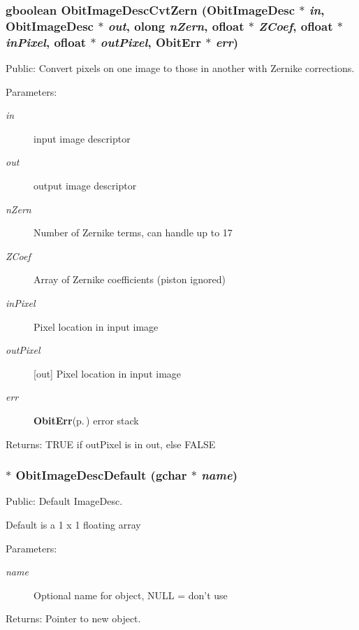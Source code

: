 \subsubsection{\setlength{\rightskip}{0pt plus 5cm}gboolean Obit\-Image\-Desc\-Cvt\-Zern ({\bf Obit\-Image\-Desc} $\ast$ {\em in}, {\bf Obit\-Image\-Desc} $\ast$ {\em out}, {\bf olong} {\em n\-Zern}, {\bf ofloat} $\ast$ {\em ZCoef}, {\bf ofloat} $\ast$ {\em in\-Pixel}, {\bf ofloat} $\ast$ {\em out\-Pixel}, {\bf Obit\-Err} $\ast$ {\em err})}\label{ObitImageDesc_8c_a13}


Public: Convert pixels on one image to those in another with Zernike corrections. 

\begin{Desc}
\item[Parameters:]
\begin{description}
\item[{\em in}]input image descriptor \item[{\em out}]output image descriptor \item[{\em n\-Zern}]Number of Zernike terms, can handle up to 17 \item[{\em ZCoef}]Array of Zernike coefficients (piston ignored) \item[{\em in\-Pixel}]Pixel location in input image \item[{\em out\-Pixel}][out] Pixel location in input image \item[{\em err}]{\bf Obit\-Err}{\rm (p.\,\pageref{structObitErr})} error stack \end{description}
\end{Desc}
\begin{Desc}
\item[Returns:]TRUE if out\-Pixel is in out, else FALSE \end{Desc}
\subsubsection{$\ast$ Obit\-Image\-Desc\-Default (gchar $\ast$ {\em name})}\label{ObitImageDesc_8c_a10}


Public: Default Image\-Desc. 

Default is a 1 x 1 floating array \begin{Desc}
\item[Parameters:]
\begin{description}
\item[{\em name}]Optional name for object, NULL = don't use \end{description}
\end{Desc}
\begin{Desc}
\item[Returns:]Pointer to new object. \end{Desc}
